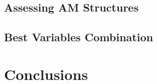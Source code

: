 \documentclass[draft]{agujournal2019}
\begin{document}



\subsection{Assessing AM Structures}
\label{structures}



\subsection{Best Variables Combination}
\label{best_multi}



\section{Conclusions}
\label{conclusions}




%
%
%
%
%
%
%
%
%
%
\end{document}
